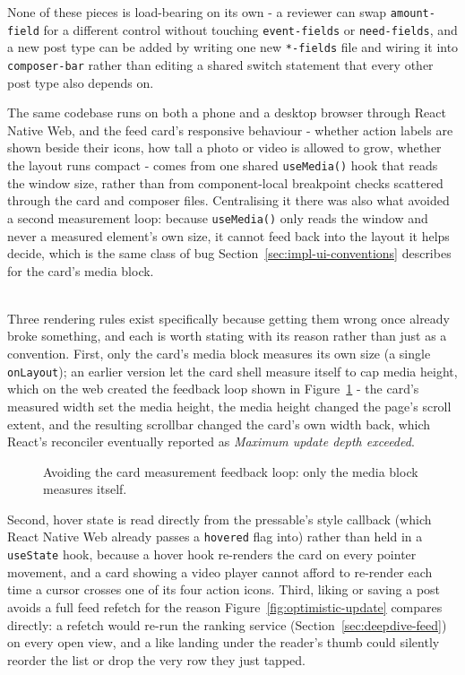 \noindent None of these pieces is load-bearing on its own - a reviewer can swap \texttt{amount-field} for a different control without touching \texttt{event-fields} or \texttt{need-fields}, and a new post type can be added by writing one new \texttt{*-fields} file and wiring it into \texttt{composer-bar} rather than editing a shared switch statement that every other post type also depends on.

\noindent The same codebase runs on both a phone and a desktop browser through React Native Web, and the feed card's responsive behaviour - whether action labels are shown beside their icons, how tall a photo or video is allowed to grow, whether the layout runs compact - comes from one shared \texttt{useMedia()} hook that reads the window size, rather than from component-local breakpoint checks scattered through the card and composer files. Centralising it there was also what avoided a second measurement loop: because \texttt{useMedia()} only reads the window and never a measured element's own size, it cannot feed back into the layout it helps decide, which is the same class of bug Section~\ref{sec:impl-ui-conventions} describes for the card's media block.

\noindent \\ Three rendering rules exist specifically because getting them wrong once already broke something, and each is worth stating with its reason rather than just as a convention. First, only the card's media block measures its own size (a single \texttt{onLayout}); an earlier version let the card shell measure itself to cap media height, which on the web created the feedback loop shown in Figure~\ref{fig:measurement-loop} - the card's measured width set the media height, the media height changed the page's scroll extent, and the resulting scrollbar changed the card's own width back, which React's reconciler eventually reported as \emph{Maximum update depth exceeded}.

\begin{figure}[H]
    \centering
    \caption{Avoiding the card measurement feedback loop: only the media block measures itself.}
    \label{fig:measurement-loop}
\end{figure}

\noindent Second, hover state is read directly from the pressable's style callback (which React Native Web already passes a \texttt{hovered} flag into) rather than held in a \texttt{useState} hook, because a hover hook re-renders the card on every pointer movement, and a card showing a video player cannot afford to re-render each time a cursor crosses one of its four action icons. Third, liking or saving a post avoids a full feed refetch for the reason Figure~\ref{fig:optimistic-update} compares directly: a refetch would re-run the ranking service (Section~\ref{sec:deepdive-feed}) on every open view, and a like landing under the reader's thumb could silently reorder the list or drop the very row they just tapped.

